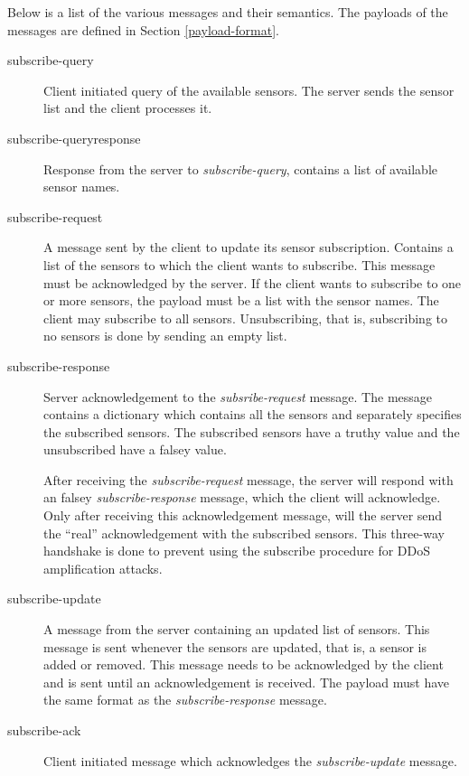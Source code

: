 \documentclass[a4paper]{article}
\begin{document}
Below is a list of the various messages and their semantics. The payloads of the
messages are defined in Section \ref{payload-format}.
\begin{description}
	\item[subscribe-query] Client initiated query of the available 
	sensors. The server sends the sensor list and the client processes it.
    
	\item[subscribe-queryresponse] Response from the server to 
	\emph{subscribe-query}, contains a list of available sensor names. 
    
	\item[subscribe-request] A message sent by the client to update its sensor
	subscription. Contains a list of the sensors to which the client wants to
	subscribe. This message must be acknowledged by the server. If the client
    wants to subscribe to one or more sensors, the payload must be a list with
    the sensor names. The client may subscribe to all sensors. Unsubscribing,
    that is, subscribing to no sensors is done by sending an empty list.

	\item[subscribe-response] Server acknowledgement to the 
	\emph{subsribe-request} message. The message contains a dictionary which
    contains all the sensors and separately specifies the subscribed sensors.
    The subscribed sensors have a truthy value and the unsubscribed have a falsey
    value. 

  	After receiving the \emph{subscribe-request} message, the server will
    respond with an falsey \emph{subscribe-response} message, which the client
    will acknowledge. Only after receiving this acknowledgement message,
    will the server send the ``real'' acknowledgement with the subscribed sensors.
    This three-way handshake is done to prevent using the subscribe procedure
    for DDoS amplification attacks.

	\item[subscribe-update] A message from the server containing an updated
	list of sensors. This message is sent whenever the sensors are updated,
	that is, a sensor is added or removed. This message needs to be acknowledged 
	by the client and is sent until an acknowledgement is received. The payload
    must have the same format as the \emph{subscribe-response} message.
    
	\item[subscribe-ack] Client initiated message which acknowledges the 
	\emph{subscribe-update} message.
    

\end{description}
\end{document}
